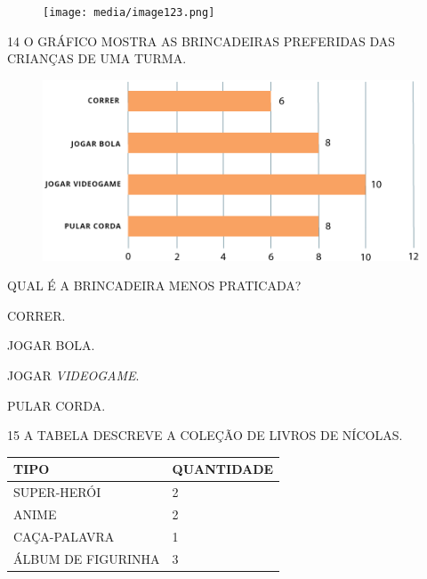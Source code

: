 \begin{figure}[H]
\texttt{[image: media/image123.png]}
\end{figure}

\num{14} O GRÁFICO MOSTRA AS BRINCADEIRAS PREFERIDAS DAS CRIANÇAS DE UMA TURMA.

\begin{figure}[H]
\includegraphics[width=\textwidth]{./media/SAEB_1ANO_MAT_FIGURA134.png}
\end{figure}

QUAL É A BRINCADEIRA MENOS PRATICADA?

\begin{escolha}[itemsep=0pt]
\item CORRER.

\item JOGAR BOLA.

\item JOGAR \textit{VIDEOGAME}.

\item PULAR CORDA.
\end{escolha}

\num{15} A TABELA DESCREVE A COLEÇÃO DE LIVROS DE NÍCOLAS.


\begin{table}[!ht]
    \centering
    \begin{tabular}{|l|l|}
    \hline
        \textbf{TIPO} & \textbf{QUANTIDADE} \\ \hline
        SUPER-HERÓI & 2 \\ \hline
        ANIME & 2 \\ \hline
        CAÇA-PALAVRA & 1 \\ \hline
        ÁLBUM DE FIGURINHA & 3 \\ \hline
    \end{tabular}
\end{table}

